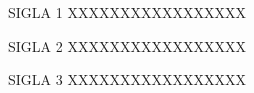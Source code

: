 \documentclass[
	12pt,					%
	openright,				%
	oneside,					%
	a4paper,					%
    xcolor=table {beamer}
	english,					%
	portuguese					%
	]{abntex2}
\begin{document}
\frenchspacing


\pretextual







%

%

%

%

%

%



\listoffigures*                 
\cleardoublepage

\listoftables*
\cleardoublepage

\begin{siglas}
\item[SIGLA 1] XXXXXXXXXXXXXXXXX
\item[SIGLA 2] XXXXXXXXXXXXXXXXX
 \item[SIGLA 3] XXXXXXXXXXXXXXXXX
\end{siglas}

\end{document}
